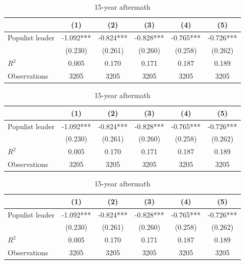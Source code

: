 \begin{table}[htbp]\centering
\def\sym#1{\ifmmode^{#1}\else\(^{#1}\)\fi}
\caption{15-year aftermath}
\begin{tabular}{l*{5}{c}}
\hline\hline
                    &\multicolumn{1}{c}{(1)}   &\multicolumn{1}{c}{(2)}   &\multicolumn{1}{c}{(3)}   &\multicolumn{1}{c}{(4)}   &\multicolumn{1}{c}{(5)}   \\
\hline
Populist leader     &      -1.092***&      -0.824***&      -0.828***&      -0.765***&      -0.726***\\
                    &     (0.230)   &     (0.261)   &     (0.260)   &     (0.258)   &     (0.262)   \\
\hline
\(R^{2}\)           &       0.005   &       0.170   &       0.171   &       0.187   &       0.189   \\
Observations        &        3205   &        3205   &        3205   &        3205   &        3205   \\
\hline\hline
\end{tabular}
\end{table}
\begin{table}[htbp]\centering
\def\sym#1{\ifmmode^{#1}\else\(^{#1}\)\fi}
\caption{15-year aftermath}
\begin{tabular}{l*{5}{c}}
\hline\hline
                    &\multicolumn{1}{c}{(1)}   &\multicolumn{1}{c}{(2)}   &\multicolumn{1}{c}{(3)}   &\multicolumn{1}{c}{(4)}   &\multicolumn{1}{c}{(5)}   \\
\hline
Populist leader     &      -1.092***&      -0.824***&      -0.828***&      -0.765***&      -0.726***\\
                    &     (0.230)   &     (0.261)   &     (0.260)   &     (0.258)   &     (0.262)   \\
\hline
\(R^{2}\)           &       0.005   &       0.170   &       0.171   &       0.187   &       0.189   \\
Observations        &        3205   &        3205   &        3205   &        3205   &        3205   \\
\hline\hline
\end{tabular}
\end{table}
\begin{table}[htbp]\centering
\def\sym#1{\ifmmode^{#1}\else\(^{#1}\)\fi}
\caption{15-year aftermath}
\begin{tabular}{l*{5}{c}}
\hline\hline
                    &\multicolumn{1}{c}{(1)}   &\multicolumn{1}{c}{(2)}   &\multicolumn{1}{c}{(3)}   &\multicolumn{1}{c}{(4)}   &\multicolumn{1}{c}{(5)}   \\
\hline
Populist leader     &      -1.092***&      -0.824***&      -0.828***&      -0.765***&      -0.726***\\
                    &     (0.230)   &     (0.261)   &     (0.260)   &     (0.258)   &     (0.262)   \\
\hline
\(R^{2}\)           &       0.005   &       0.170   &       0.171   &       0.187   &       0.189   \\
Observations        &        3205   &        3205   &        3205   &        3205   &        3205   \\
\hline\hline
\end{tabular}
\end{table}
